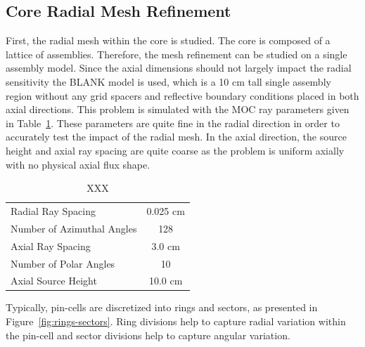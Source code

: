 \subsection{Core Radial Mesh Refinement}

First, the radial mesh within the core is studied. The core is composed of a lattice of assemblies. Therefore, the mesh refinement can be studied on a single assembly model. Since the axial dimensions should not largely impact the radial sensitivity the BLANK model is used, which is a 10 cm tall single assembly region without any grid spacers and reflective boundary conditions placed in both axial directions. This problem is simulated with the \ac{MOC} ray parameters given in Table~\ref{tab:rad-mesh-refinement-params}. These parameters are quite fine in the radial direction in order to accurately test the impact of the radial mesh. In the axial direction, the source height and axial ray spacing are quite coarse as the problem is uniform axially with no physical axial flux shape.

\begin{table}[ht]
	\centering
	\caption{XXX}
	\medskip
	\begin{tabular}{lc}
		\hline
		Radial Ray Spacing & 0.025 cm \\
		Number of Azimuthal Angles & 128 \\
		Axial Ray Spacing & 3.0 cm \\
		Number of Polar Angles & 10 \\
		Axial Source Height & 10.0 cm \\
		\hline
	\end{tabular}
	\label{tab:rad-mesh-refinement-params}
\end{table}

Typically, pin-cells are discretized into rings and sectors, as presented in Figure~\ref{fig:rings-sectors}. Ring divisions help to capture radial variation within the pin-cell and sector divisions help to capture angular variation.

